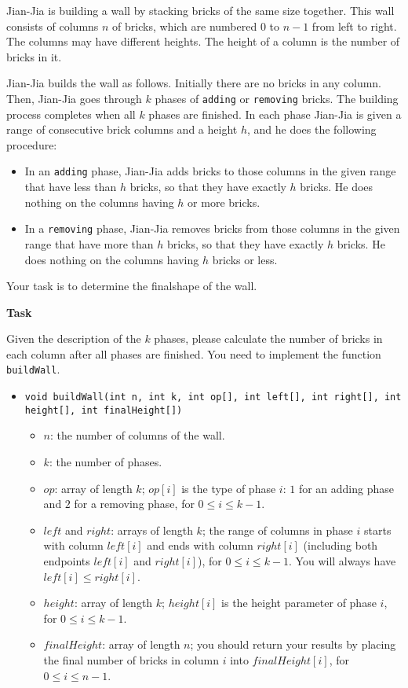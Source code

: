 Jian-Jia is building a wall by stacking bricks of the same size together. This wall consists of columns $n$ of bricks, which are numbered $0$ to $n - 1$ from left to right. The columns may have different heights. The height of a column is the number of bricks in it.

Jian-Jia builds the wall as follows. Initially there are no bricks in any column. Then, Jian-Jia goes through $k$ phases of \texttt{adding} or \texttt{removing} bricks. The building process completes when all $k$ phases are finished. In each phase Jian-Jia is given a range of consecutive brick columns and a height $h$, and he does the following procedure:

\begin{itemize}
\item In an \texttt{adding} phase, Jian-Jia adds bricks to those columns in the given range that have less than $h$ bricks, so that they have exactly $h$ bricks. He does nothing on the columns having $h$ or more bricks.
\item In a \texttt{removing} phase, Jian-Jia removes bricks from those columns in the given range that have more than $h$ bricks, so that they have exactly $h$ bricks. He does nothing on the columns having $h$ bricks or less.
\end{itemize}

Your task is to determine the finalshape of the wall.

\textbf{Task}

Given the description of the $k$ phases, please calculate the number of bricks in each column after all phases are finished. You need to implement the function \texttt{buildWall}.

\begin{itemize} 
\item \texttt{void buildWall(int n, int k, int op[], int left[], int right[],
int height[], int finalHeight[])}
\begin{itemize} 
\item $n$: the number of columns of the wall.
\item $k$: the number of phases.
\item $op$: array of length $k$; $op[i]$ is the type of phase $i$: $1$ for an adding phase and $2$ for a removing phase, for $0 \le i \le k - 1$.
\item $left$ and $right$: arrays of length $k$; the range of columns in phase $i$ starts with column $left[i]$ and ends with column $right[i]$ (including both endpoints $left[i]$ and $right[i]$), for $0 \le i \le k - 1$. You will always have $left[i] \le right[i]$.
\item $height$: array of length $k$; $height[i]$ is the height parameter of phase $i$, for $0 \le i \le k - 1$.
\item $finalHeight$: array of length $n$; you should return your results by placing the final number of bricks in column $i$ into $finalHeight[i]$, for $0 \le i \le n - 1$.
\end{itemize}
\end{itemize}